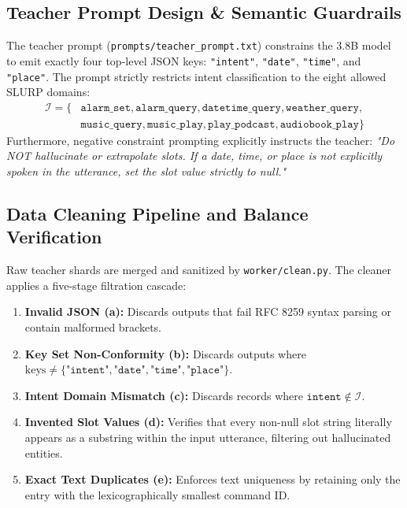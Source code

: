 \documentclass[10pt,a4paper]{article}
\begin{document}
\subsection{Teacher Prompt Design \& Semantic Guardrails}
The teacher prompt (\texttt{prompts/teacher\_prompt.txt}) constrains the 3.8B model to emit exactly four top-level JSON keys: \texttt{"intent"}, \texttt{"date"}, \texttt{"time"}, and \texttt{"place"}. The prompt strictly restricts intent classification to the eight allowed SLURP domains:
\begin{align*}
\mathcal{I} = \{ &\texttt{alarm\_set}, \texttt{alarm\_query}, \texttt{datetime\_query}, \texttt{weather\_query}, \\
&\texttt{music\_query}, \texttt{music\_play}, \texttt{play\_podcast}, \texttt{audiobook\_play} \}
\end{align*}
Furthermore, negative constraint prompting explicitly instructs the teacher: \textit{"Do NOT hallucinate or extrapolate slots. If a date, time, or place is not explicitly spoken in the utterance, set the slot value strictly to null."}

\subsection{Data Cleaning Pipeline and Balance Verification}
Raw teacher shards are merged and sanitized by \texttt{worker/clean.py}. The cleaner applies a five-stage filtration cascade:
\begin{enumerate}[noitemsep,topsep=2pt,leftmargin=*]
    \item \textbf{Invalid JSON (a):} Discards outputs that fail RFC 8259 syntax parsing or contain malformed brackets.
    \item \textbf{Key Set Non-Conformity (b):} Discards outputs where $\text{keys} \neq \{\texttt{"intent"}, \texttt{"date"}, \texttt{"time"}, \texttt{"place"}\}$.
    \item \textbf{Intent Domain Mismatch (c):} Discards records where $\texttt{intent} \notin \mathcal{I}$.
    \item \textbf{Invented Slot Values (d):} Verifies that every non-null slot string literally appears as a substring within the input utterance, filtering out hallucinated entities.
    \item \textbf{Exact Text Duplicates (e):} Enforces text uniqueness by retaining only the entry with the lexicographically smallest command ID.
\end{enumerate}
\end{document}
